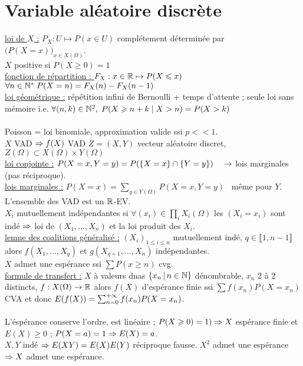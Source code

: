 \documentclass[12 pt]{exampleclass}
\begin{document}
\section{Variable aléatoire discrète}
\underline{loi de $X$ :} $P_X : U\mapsto P(x\in U)$ \qquad complétement déterminée par $\big(P(X=x)\big)_{x\in X(\Omega)}$.\\
$X$ positive si $P(X\geqslant0) =1$\\
\underline{fonction de répartition : } $F_X : x\in\mathbb{R} \mapsto P(X\leqslant x)$ \quad $\forall n\in \mathbb{N}^*\; P(X=n)=F_X(n)-F_X(n-1)$\\
\underline{loi géométrique :} répétition infini de Bernoulli + temps d'attente ; seule loi sans mémoire i.e. $\forall (n,k)\in \mathbb{N}^2, \; P(X\geqslant n+k \;|\; X> n) = P(X>k)$\\
\text{}\\
Poisson = loi binomiale, approximation valide ssi $p<<1$.\\
$X$ VAD  $\Rightarrow f(X)$ VAD \quad $Z=(X,Y)$ vecteur aléatoire discret, $Z(\Omega)\subset X(\Omega)\times Y(\Omega)$\\
\underline{loi conjointe :} $P(X=x,Y=y) = P(\{X=x\}\cap \{Y=y\}) \quad \rightarrow$ lois marginales (pas réciproque).\\
\underline{lois marginales :} $P(X=x)=\sum_{y\in Y(\Omega)} P(X=x,Y=y)$ \ même pour $Y$.\\
L'ensemble des VAD est un $\mathbb{R}$-EV.\\
$X_i$ mutuellement indépendantes si $\forall (x_i)\in \prod_i X_i(\Omega)$ les $(X_i=x_i)$ sont indé $\Rightarrow$ loi de $(X_1,\dots,X_n)$ et la loi produit des $X_i$.\\
\underline{lemne des coalitions généralisé :} $(X_i)_{1\leqslant i\leqslant n}$ mutuellement indé, $q\in \llbracket 1,n-1\rrbracket$ alors $f(X_1,\dots,X_q)$ et $g(X_{q+1},\dots,X_n)$ indépendantes.\\
$X$ admet une espérance ssi $\sum P(x\geqslant n)$ cvg.\\
\underline{formule de transfert :} $X$ à valeurs dnas $\{x_n \, |\, n\in\mathbb{N}\}$ dénombrable, $x_n$ 2 à 2 distincts, $f:X(\Omega)\to \mathbb{R}$ alors $f(X)$ d'espérance finie ssi $\sum f(x_n) P(X=x_n)$ CVA et donc $E(f(X)) = \sum_{n=0}^{+\infty} f(x_n)P(X=x_n)$.\\
\text{}\\
L'éspérance conserve l'ordre, est linéaire ; $P(X\geqslant 0) =1) \Rightarrow X$ espérance finie et $E(X)\geqslant 0$ ; $P(X=a) =1 \Rightarrow E(X)=a$.\\
$X,Y$ indé $\Rightarrow E(XY)=E(X)E(Y)$ réciproque fausse. $X^2$ admet une espérance $\Rightarrow X$ admet une espérance.\\
\end{document}
